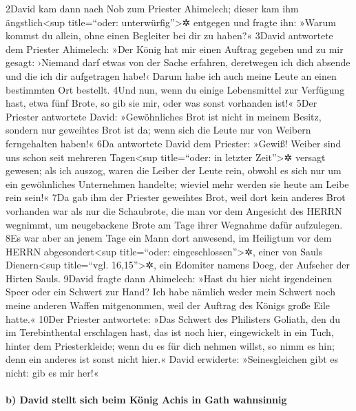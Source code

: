 2David kam dann nach Nob zum Priester Ahimelech; dieser kam ihm
ängstlich\textless sup title=``oder: unterwürfig''\textgreater✲ entgegen
und fragte ihn: »Warum kommst du allein, ohne einen Begleiter bei dir zu
haben?« 3David antwortete dem Priester Ahimelech: »Der König hat mir
einen Auftrag gegeben und zu mir gesagt: ›Niemand darf etwas von der
Sache erfahren, deretwegen ich dich absende und die ich dir aufgetragen
habe!‹ Darum habe ich auch meine Leute an einen bestimmten Ort bestellt.
4Und nun, wenn du einige Lebensmittel zur Verfügung hast, etwa fünf
Brote, so gib sie mir, oder was sonst vorhanden ist!« 5Der Priester
antwortete David: »Gewöhnliches Brot ist nicht in meinem Besitz, sondern
nur geweihtes Brot ist da; wenn sich die Leute nur von Weibern
ferngehalten haben!« 6Da antwortete David dem Priester: »Gewiß! Weiber
sind uns schon seit mehreren Tagen\textless sup title=``oder: in letzter
Zeit''\textgreater✲ versagt gewesen; als ich auszog, waren die Leiber
der Leute rein, obwohl es sich nur um ein gewöhnliches Unternehmen
handelte; wieviel mehr werden sie heute am Leibe rein sein!« 7Da gab ihm
der Priester geweihtes Brot, weil dort kein anderes Brot vorhanden war
als nur die Schaubrote, die man vor dem Angesicht des HERRN wegnimmt, um
neugebackene Brote am Tage ihrer Wegnahme dafür aufzulegen. 8Es war aber
an jenem Tage ein Mann dort anwesend, im Heiligtum vor dem HERRN
abgesondert\textless sup title=``oder: eingeschlossen''\textgreater✲,
einer von Sauls Dienern\textless sup title=``vgl. 16,15''\textgreater✲,
ein Edomiter namens Doeg, der Aufseher der Hirten Sauls. 9David fragte
dann Ahimelech: »Hast du hier nicht irgendeinen Speer oder ein Schwert
zur Hand? Ich habe nämlich weder mein Schwert noch meine anderen Waffen
mitgenommen, weil der Auftrag des Königs große Eile hatte.« 10Der
Priester antwortete: »Das Schwert des Philisters Goliath, den du im
Terebinthental erschlagen hast, das ist noch hier, eingewickelt in ein
Tuch, hinter dem Priesterkleide; wenn du es für dich nehmen willst, so
nimm es hin; denn ein anderes ist sonst nicht hier.« David erwiderte:
»Seinesgleichen gibt es nicht: gib es mir her!«

\hypertarget{b-david-stellt-sich-beim-kuxf6nig-achis-in-gath-wahnsinnig}{%
\paragraph{b) David stellt sich beim König Achis in Gath
wahnsinnig}\label{b-david-stellt-sich-beim-kuxf6nig-achis-in-gath-wahnsinnig}}


